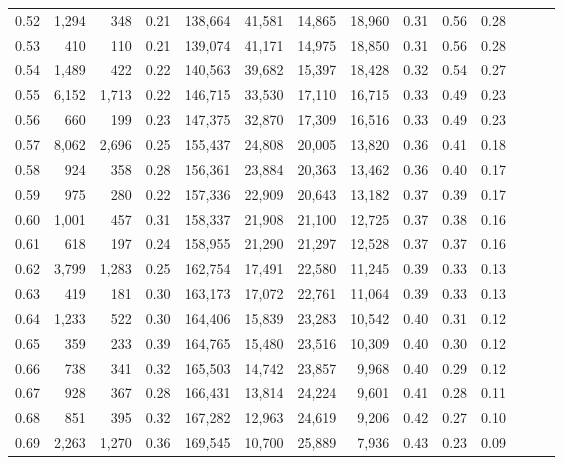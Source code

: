 \begin{tabular}{rrrrrrrrrrrrrr}
0.52 &   1,294 &    348 &  0.21 &  138,664 &   41,581 &  14,865 &  18,960 &  0.31 &  0.56 &      0.28 \\
0.53 &     410 &    110 &  0.21 &  139,074 &   41,171 &  14,975 &  18,850 &  0.31 &  0.56 &      0.28 \\
0.54 &   1,489 &    422 &  0.22 &  140,563 &   39,682 &  15,397 &  18,428 &  0.32 &  0.54 &      0.27 \\
0.55 &   6,152 &  1,713 &  0.22 &  146,715 &   33,530 &  17,110 &  16,715 &  0.33 &  0.49 &      0.23 \\
0.56 &     660 &    199 &  0.23 &  147,375 &   32,870 &  17,309 &  16,516 &  0.33 &  0.49 &      0.23 \\
0.57 &   8,062 &  2,696 &  0.25 &  155,437 &   24,808 &  20,005 &  13,820 &  0.36 &  0.41 &      0.18 \\
0.58 &     924 &    358 &  0.28 &  156,361 &   23,884 &  20,363 &  13,462 &  0.36 &  0.40 &      0.17 \\
0.59 &     975 &    280 &  0.22 &  157,336 &   22,909 &  20,643 &  13,182 &  0.37 &  0.39 &      0.17 \\
0.60 &   1,001 &    457 &  0.31 &  158,337 &   21,908 &  21,100 &  12,725 &  0.37 &  0.38 &      0.16 \\
0.61 &     618 &    197 &  0.24 &  158,955 &   21,290 &  21,297 &  12,528 &  0.37 &  0.37 &      0.16 \\
0.62 &   3,799 &  1,283 &  0.25 &  162,754 &   17,491 &  22,580 &  11,245 &  0.39 &  0.33 &      0.13 \\
0.63 &     419 &    181 &  0.30 &  163,173 &   17,072 &  22,761 &  11,064 &  0.39 &  0.33 &      0.13 \\
0.64 &   1,233 &    522 &  0.30 &  164,406 &   15,839 &  23,283 &  10,542 &  0.40 &  0.31 &      0.12 \\
0.65 &     359 &    233 &  0.39 &  164,765 &   15,480 &  23,516 &  10,309 &  0.40 &  0.30 &      0.12 \\
0.66 &     738 &    341 &  0.32 &  165,503 &   14,742 &  23,857 &   9,968 &  0.40 &  0.29 &      0.12 \\
0.67 &     928 &    367 &  0.28 &  166,431 &   13,814 &  24,224 &   9,601 &  0.41 &  0.28 &      0.11 \\
0.68 &     851 &    395 &  0.32 &  167,282 &   12,963 &  24,619 &   9,206 &  0.42 &  0.27 &      0.10 \\
0.69 &   2,263 &  1,270 &  0.36 &  169,545 &   10,700 &  25,889 &   7,936 &  0.43 &  0.23 &      0.09 \\

\end{tabular}
